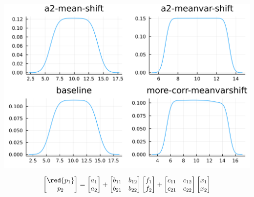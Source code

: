 \documentclass[
  ignorenonframetext,
]{beamer}
\begin{document}
\begin{frame}{}
\protect\hypertarget{section-2}{}
\begin{center}\includegraphics[width=0.95\paperheight]{complexity_files/figure-beamer/unnamed-chunk-24-1} \end{center}

\[
\begin{bmatrix}
 \red{p_1} \\ p_2
\end{bmatrix} =
\begin{bmatrix}
 {a_1} \\ a_2
\end{bmatrix}
 + 
 \begin{bmatrix}
 b_{11} & b_{12} \\
 b_{21} & b_{22}
\end{bmatrix}
\begin{bmatrix}
 f_1 \\ f_2
\end{bmatrix}
+
 \begin{bmatrix}
 c_{11} & c_{12} \\
 c_{21} & c_{22}
\end{bmatrix}
\begin{bmatrix}
 x_1 \\ x_2
\end{bmatrix}
\]
\end{frame}
\end{document}
